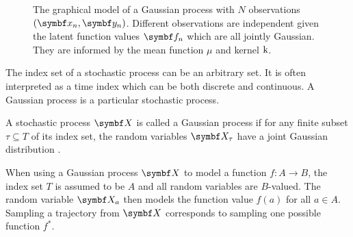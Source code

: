 \begin{figure}[t]
    \centering
    \caption[Graphical model: Gaussian process]{
        \label{fig:gp:graphical_model}
        The graphical model of a Gaussian process with $N$ observations $(\mat{x}_n, \mat{y}_n)$.
        Different observations are independent given the latent function values $\mat{f}_n$ which are all jointly Gaussian.
        They are informed by the mean function $\mu$ and kernel $\operatorname{k}$.
    }
\end{figure}
The index set of a stochastic process can be an arbitrary set.
It is often interpreted as a time index which can be both discrete and continuous.
A Gaussian process is a particular stochastic process.
\begin{definition}
    \label{def:gp:gaussian_process}
    A stochastic process $\rv{X}$ is called a Gaussian process if for any finite subset $\tau \subseteq T$ of its index set, the random variables $\rv{X}_\tau$ have a joint Gaussian distribution \cite{astrom_introduction_1971}.
\end{definition}
When using a Gaussian process $\rv{X}$ to model a function $f \colon A \to B$, the index set $T$ is assumed to be $A$ and all random variables are $B$-valued.
The random variable $\rv{X}_a$ then models the function value $f(a)$ for all $a \in A$.
Sampling a trajectory from $\rv{X}$ corresponds to sampling one possible function $f^\ast$.

